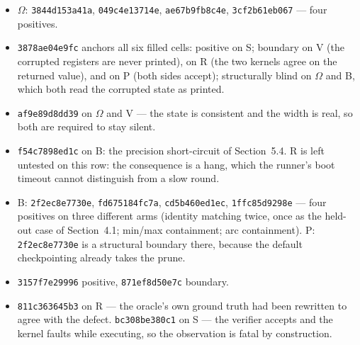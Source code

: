 \begin{itemize}\setlength{\itemsep}{1pt}\sloppy\emergencystretch=2em
\item[1.] $\Omega$: \texttt{3844d153a41a}, \texttt{049c4e13714e},
  \texttt{ae67b9fb8c4e}, \texttt{3cf2b61eb067} --- four positives.
\item[2.] \texttt{3878ae04e9fc} anchors all six filled cells: positive on S;
  boundary on V (the corrupted registers are never printed), on R (the two kernels
  agree on the returned value), and on P (both sides accept); structurally blind on
  $\Omega$ and B, which both read the corrupted state as printed.
\item[3.] \texttt{af9e89d8dd39} on $\Omega$ and V --- the state is consistent and the
  width is real, so both are required to stay silent.
\item[4.] \texttt{f54c7898ed1c} on B: the precision short-circuit of Section~5.4. R is
  left untested on this row: the consequence is a hang, which the runner's boot timeout
  cannot distinguish from a slow round.
\item[5.] B: \texttt{2f2ec8e7730e}, \texttt{fd675184fc7a}, \texttt{cd5b460ed1ec},
  \texttt{1ffc85d9298e} --- four positives on three different arms (identity matching
  twice, once as the held-out case of Section~4.1; min/max containment; arc
  containment). P: \texttt{2f2ec8e7730e} is a structural boundary there, because
  the default checkpointing already takes the prune.
\item[7.] \texttt{3157f7e29996} positive, \texttt{871ef8d50e7c} boundary.
\item[8.] \texttt{811c363645b3} on R --- the oracle's own ground truth had been
  rewritten to agree with the defect. \texttt{bc308be380c1} on S --- the verifier
  accepts and the kernel faults while executing, so the observation is fatal by
  construction.
\end{itemize}
